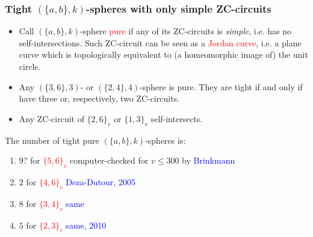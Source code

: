 \documentclass{beamer}
\begin{document}
\begin{frame}\frametitle{Tight $(\{a,b\},k)$-spheres with only simple
ZC-circuits}
\begin{itemize}
\item
Call $(\{a,b\},k)$-sphere \textcolor{red}{pure} if any of its
ZC-circuits is {\em simple}, i.e. has no self-intersections.
Such ZC-circuit can be seen as a \textcolor{red}{Jordan curve}, i.e. a plane curve 
which is 
topologically equivalent to (a 
homeomorphic image of) the unit circle.



\item Any $(\{3,6\},3)$- or $(\{2,4\},4)$-sphere is pure. They are
tight if and only if have three  or, respectively, two 
 ZC-circuits.
\item Any ZC-circuit of $\{2,6\}_v$ or  $\{1,3\}_v$
self-intersects.
\end{itemize}
\pause

The number of tight pure  $(\{a,b\},k)$-spheres is:
 
 \begin{enumerate}
\item[\ding{108}] $9?$ for \textcolor{red}{$\{5,6\}_v$} computer-checked for 
$v\le 300$ by \textcolor{blue}{Brinkmann}
\item[\ding{108}] $2$ for \textcolor{red}{$\{4,6\}_v$}
\textcolor{blue}{Deza-Dutour, 2005}
\item[\ding{108}] $8$ for \textcolor{red}{$\{3,4\}_v$}
 \textcolor{blue}{same}
\item[\ding{108}] $5$ for \textcolor{red}{$\{2, 3\}_v$}  \textcolor{blue}{same, 2010}
\end{enumerate}
\end{frame}
\end{document}
